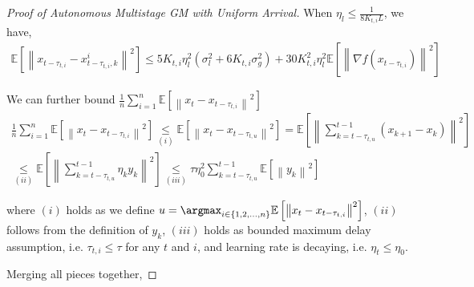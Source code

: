 \begin{proof}[Proof of Autonomous Multistage GM with Uniform Arrival]
When $\eta_l\leq \frac{1}{8K_{t,i}L}$, we have,
\begin{equation}
\begin{gathered}
\mathbb{E}\left[\left\| x_{t-\tau_{t,i}}-x_{t-\tau_{t,i},k}^i  \right\|^2\right] \leq 5 K_{t,i}\eta_l^2\left(\sigma_l^2+6K_{t,i}\sigma_g^2\right)+30K_{t,i}^2\eta_l^2 \mathbb{E}\left[\left\| \nabla f(x_{t-\tau_{t,i}})\right\|^2\right]
\end{gathered}\nonumber
\end{equation}

We can further bound $\frac{1}{n}\sum_{i=1}^n \mathbb{E}\left[\left\| x_t - x_{t-\tau_{t,i}} \right\|^2\right]$
\begin{equation}
\begin{gathered}
\frac{1}{n}\sum_{i=1}^n \mathbb{E}\left[\left\| x_t - x_{t-\tau_{t,i}} \right\|^2\right] 
\underset{(i)}{\leq}  \mathbb{E}\left[\left\| x_t - x_{t-\tau_{t,u}} \right\|^2\right] = \mathbb{E}\left[\left\| \sum_{k=t-\tau_{t,u}}^{t-1} \left(x_{k+1}-x_k\right) \right\|^2\right] \\
\underset{(ii)}{\leq} \mathbb{E}\left[\left\| \sum_{k=t-\tau_{t,u}}^{t-1} \eta_k y_k \right\|^2\right] \underset{(iii)}{\leq} \tau \eta_0^2 \sum_{k=t-\tau_{t,u}}^{t-1}\mathbb{E}\left[\left\|  y_k \right\|^2\right]
\end{gathered}\nonumber
\end{equation}

where $(i)$ holds as we define $u=\argmax_{i\in\{1,2,\dots,n\}}\mathbb{E}\left[\left\| x_t - x_{t-\tau_{t,i}} \right\|^2\right] $, $(ii)$ follows from the definition of $y_k$, $(iii)$ holds as bounded maximum delay assumption, i.e. $\tau_{t,i}\leq \tau$ for any $t$ and $i$, and learning rate is decaying, i.e. $\eta_t\leq\eta_0$.



Merging all pieces together,


\end{proof}
